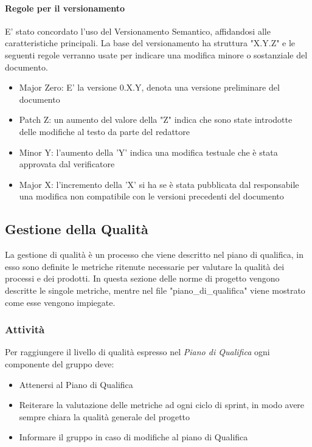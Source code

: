 \documentclass[12pt]{article}
\begin{document}
\paragraph{Regole per il versionamento}
\label{ver}
E' stato concordato l'uso del Versionamento Semantico, affidandosi alle caratteristiche principali.
La base del versionamento ha struttura "X.Y.Z" e le seguenti regole verranno usate per indicare una modifica minore o sostanziale del documento.
\begin{itemize}
    \item Major Zero: E' la versione 0.X.Y, denota una versione preliminare del documento
    \item Patch Z: un aumento del valore della "Z" indica che sono state introdotte delle modifiche al testo da parte del redattore
    \item Minor Y: l'aumento della 'Y' indica una modifica testuale che è stata approvata dal verificatore
    \item Major X: l'incremento della 'X' si ha se è stata pubblicata dal responsabile una modifica non compatibile con le versioni precedenti del documento
\end{itemize}

\subsection{Gestione della Qualità}
La gestione di qualità è un processo che viene descritto nel piano di qualifica, in esso sono definite le metriche ritenute necessarie per valutare la qualità dei processi e dei prodotti.
In questa sezione delle norme di progetto vengono descritte le singole metriche, mentre nel file "piano\_di\_qualifica" viene mostrato come esse vengono impiegate.

\subsubsection{Attività}
Per raggiungere il livello di qualità espresso nel \textit{Piano di Qualifica} ogni componente del gruppo deve:
\begin{itemize}
    \item Attenersi al Piano di Qualifica
    \item Reiterare la valutazione delle metriche ad ogni ciclo di sprint, in modo avere sempre chiara la qualità generale del progetto
    \item Informare il gruppo in caso di modifiche al piano di Qualifica
\end{itemize}
\end{document}
